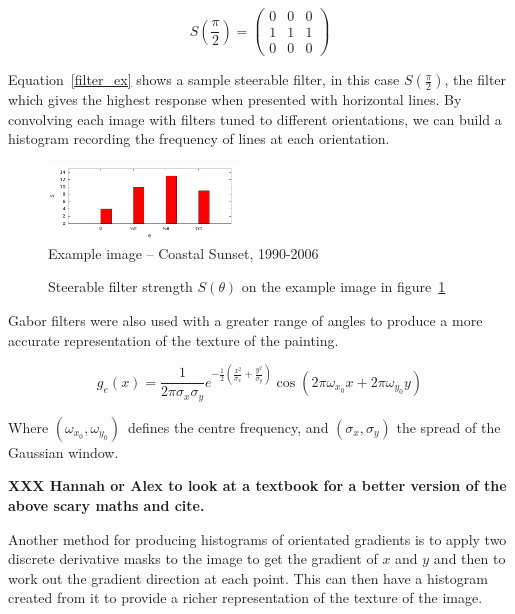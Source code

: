 \documentclass[conference,a4paper]{IEEEtran}
\begin{document}
\begin{equation}
S\left(\frac{\pi}{2}\right) = \left( \begin{array}{ccc}
0 & 0 & 0 \\
1 & 1 & 1 \\
0 & 0 & 0 \end{array} \right)
\label{filter_ex}
\end{equation}

Equation~\ref{filter_ex} shows a sample steerable filter, in this case
$S(\frac{\pi}{2})$, the filter which gives the highest response when presented
with horizontal lines. By convolving each image with filters tuned to different
orientations, we can build a histogram recording the frequency of lines at each
orientation.

\begin{figure}[h]
\centering
\includegraphics[width=0.45\textwidth]{img/steerable}
\caption{Example image -- Coastal Sunset, 1990-2006}\label{fig:example-img}
\end{figure}

\begin{figure}[h]
\centering

\caption{Steerable filter strength $S(\theta)$ on the example image in figure~\ref{fig:example-img}}
\end{figure}

Gabor filters were also used with a greater range of angles to produce a more
accurate representation of the texture of the painting.

\begin{equation}
g_e(x) = \frac{1}{2\pi\sigma_x \sigma_y}e^{-\frac{1}{2}\left(\frac{x^2}{\sigma_x}+\frac{y^2}{\sigma_y}\right)}\cos(2\pi\omega_{x_0}x + 2\pi\omega_{y_0}y)
\label{gabor_eq}
\end{equation}

Where $(\omega_{x_0},\omega_{y_0})$\ defines the centre frequency, and
$(\sigma_x,\sigma_y)$ the spread of the Gaussian window.

\textbf{XXX Hannah or Alex to look at a textbook for a better version of the above scary maths and cite.}

Another method for producing histograms of orientated gradients is to apply two
discrete derivative masks to the image to get the gradient of $x$ and $y$ and
then to work out the gradient direction at each point. This can then have a
histogram created from it to provide a richer representation of the texture of
the image.
\end{document}
